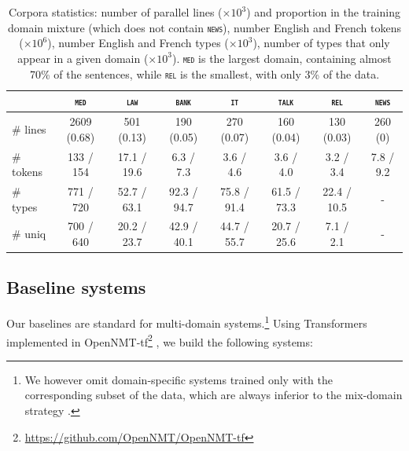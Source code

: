 \documentclass[11pt]{article}
\newcommand{\domain}[1]{\texttt{\textsc{#1}}}
\begin{document}
\begin{table}[htbp]
  \centering
  \begin{tabular}{|l|ccccccc|} %
    \cline{2-8} 
    \multicolumn{1}{c|}{} & \multicolumn{1}{c}{\domain{med}} & \multicolumn{1}{c}{\domain{law}} & \multicolumn{1}{c}{\domain{bank}} & \multicolumn{1}{c}{\domain{it}} & \multicolumn{1}{c}{\domain{talk}} & \multicolumn{1}{c}{\domain{rel}} & \multicolumn{1}{c|}{\domain{news}} \\
    \hline 
    \# lines & 2609 (0.68) & 501 (0.13) & 190 (0.05) & 270 (0.07) & 160 (0.04) & 130 (0.03) & 260 (0) \\
    \# tokens &  133 / 154  &  17.1 / 19.6 &  6.3 / 7.3 &  3.6 / 4.6 &  3.6 / 4.0 &  3.2 / 3.4 & 7.8 / 9.2   \\
    \# types & 771 / 720 & 52.7 / 63.1 & 92.3 / 94.7 & 75.8 / 91.4 & 61.5 / 73.3 & 22.4 / 10.5 & - \\
    \# uniq & 700 / 640 & 20.2 / 23.7 & 42.9 / 40.1 & 44.7 / 55.7 & 20.7 / 25.6 & 7.1 / 2.1 & - \\
    \hline
  \end{tabular}
  \caption{Corpora statistics: number of parallel lines ($\times 10^3$) and proportion in the training domain mixture (which does not contain \domain{news}), number English and French tokens ($\times 10^6$), number English and French types ($\times 10^3$), number of types that only appear in a given domain ($\times 10^3$). \domain{med} is the largest domain, containing almost 70\% of the sentences, while \domain{rel} is the smallest, with only 3\% of the data.
  }
\label{tab:Corpora}
\end{table}

\subsection{Baseline systems \label{ssec:baseline}}
Our baselines are standard for multi-domain systems.\footnote{We however omit domain-specific systems trained only with the corresponding subset of the data, which are always inferior to the mix-domain strategy \citep{Britz17mixing}.} Using Transformers \citep{Vaswani17attention} implemented in OpenNMT-tf\footnote{\url{https://github.com/OpenNMT/OpenNMT-tf}} \citep{Klein17opennmt}, we build the following systems:
\end{document}
